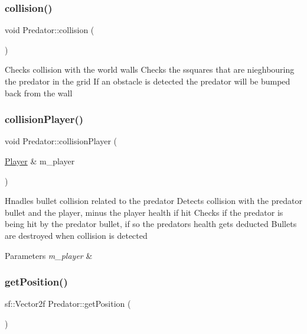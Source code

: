 \subsubsection{\texorpdfstring{collision()}{collision()}}
{\footnotesize\ttfamily void Predator\+::collision (\begin{DoxyParamCaption}{ }\end{DoxyParamCaption})}



Checks collision with the world walls Checks the ssquares that are nieghbouring the predator in the grid If an obstacle is detected the predator will be bumped back from the wall 

\mbox{\label{class_predator_a69c268f1736c04f1bea413a71e087fe4}} 
\subsubsection{\texorpdfstring{collisionPlayer()}{collisionPlayer()}}
{\footnotesize\ttfamily void Predator\+::collision\+Player (\begin{DoxyParamCaption}\item[{\mbox{\hyperlink{class_player}{Player}} \&}]{m\+\_\+player }\end{DoxyParamCaption})}



Hnadles bullet collision related to the predator Detects collision with the predator bullet and the player, minus the player health if hit Checks if the predator is being hit by the predator bullet, if so the predators health gets deducted Bullets are destroyed when collision is detected 


\begin{DoxyParams}{Parameters}
{\em m\+\_\+player} & \\
\hline
\end{DoxyParams}
\mbox{\label{class_predator_aedebee8eb0a1f05ae209a44a014b3e97}} 
\subsubsection{\texorpdfstring{getPosition()}{getPosition()}}
{\footnotesize\ttfamily sf\+::\+Vector2f Predator\+::get\+Position (\begin{DoxyParamCaption}{ }\end{DoxyParamCaption})}



